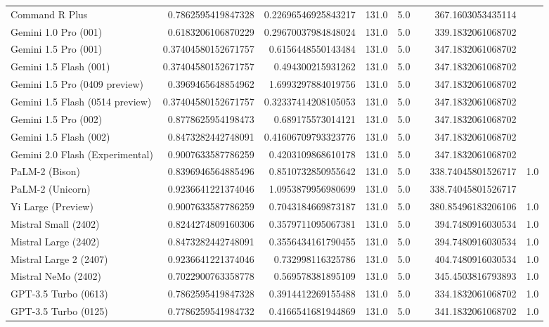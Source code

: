 \begin{table}[htp]
{\begin{tabular}{lrrrrrrr}
Command R Plus & 0.7862595419847328 & 0.22696546925843217 & 131.0 & 5.0 &  & 367.1603053435114 &  \\
Gemini 1.0 Pro (001) & 0.6183206106870229 & 0.29670037984848024 & 131.0 & 5.0 &  & 339.1832061068702 &  \\
Gemini 1.5 Pro (001) & 0.37404580152671757 & 0.6156448550143484 & 131.0 & 5.0 &  & 347.1832061068702 &  \\
Gemini 1.5 Flash (001) & 0.37404580152671757 & 0.494300215931262 & 131.0 & 5.0 &  & 347.1832061068702 &  \\
Gemini 1.5 Pro (0409 preview) & 0.3969465648854962 & 1.6993297884019756 & 131.0 & 5.0 &  & 347.1832061068702 &  \\
Gemini 1.5 Flash (0514 preview) & 0.37404580152671757 & 0.32337414208105053 & 131.0 & 5.0 &  & 347.1832061068702 &  \\
Gemini 1.5 Pro (002) & 0.8778625954198473 & 0.689175573014121 & 131.0 & 5.0 &  & 347.1832061068702 &  \\
Gemini 1.5 Flash (002) & 0.8473282442748091 & 0.41606709793323776 & 131.0 & 5.0 &  & 347.1832061068702 &  \\
Gemini 2.0 Flash (Experimental) & 0.9007633587786259 & 0.4203109868610178 & 131.0 & 5.0 &  & 347.1832061068702 &  \\
PaLM-2 (Bison) & 0.8396946564885496 & 0.8510732850955642 & 131.0 & 5.0 &  & 338.74045801526717 & 1.0 \\
PaLM-2 (Unicorn) & 0.9236641221374046 & 1.0953879956980699 & 131.0 & 5.0 &  & 338.74045801526717 &  \\
Yi Large (Preview) & 0.9007633587786259 & 0.7043184669873187 & 131.0 & 5.0 &  & 380.85496183206106 & 1.0 \\
Mistral Small (2402) & 0.8244274809160306 & 0.3579711095067381 & 131.0 & 5.0 &  & 394.7480916030534 & 1.0 \\
Mistral Large (2402) & 0.8473282442748091 & 0.3556434161790455 & 131.0 & 5.0 &  & 394.7480916030534 & 1.0 \\
Mistral Large 2 (2407) & 0.9236641221374046 & 0.732998116325786 & 131.0 & 5.0 &  & 404.7480916030534 & 1.0 \\
Mistral NeMo (2402) & 0.7022900763358778 & 0.569578381895109 & 131.0 & 5.0 &  & 345.4503816793893 & 1.0 \\
GPT-3.5 Turbo (0613) & 0.7862595419847328 & 0.3914412269155488 & 131.0 & 5.0 &  & 334.1832061068702 & 1.0 \\
GPT-3.5 Turbo (0125) & 0.7786259541984732 & 0.4166541681944869 & 131.0 & 5.0 &  & 341.1832061068702 & 1.0 \\

\end{tabular}}
\end{table}
